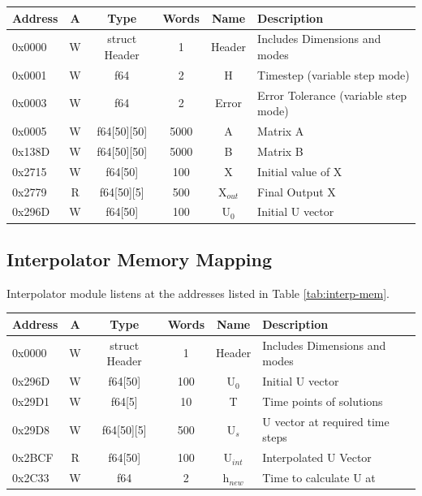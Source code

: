 \documentclass[12pt]{report}
\begin{document}
\begin{center}
 \begin{tabular}{||l| c| c| c| c| l||} 
 \hline
 Address & A & Type & Words & Name & Description  \\ [0.5ex] 
 \hline\hline
  0x0000 & W & struct Header & 1 & Header & Includes Dimensions and modes  \\ 
 \hline
 0x0001  & W & f64 & 2 & H & Timestep (variable step mode)  \\
 \hline
 0x0003  & W & f64 & 2 & Error & Error Tolerance (variable step mode) \\
 \hline
 0x0005  & W & f64[50][50] & 5000 & A & Matrix A \\
 \hline
 0x138D  & W & f64[50][50] & 5000 & B & Matrix B \\
 \hline
 0x2715  & W & f64[50] & 100 & X & Initial value of X \\
 \hline
 0x2779  & R & f64[50][5] & 500 & X$_{out}$ & Final Output X \\
 \hline
 0x296D  & W & f64[50] & 100 & U$_{0}$ & Initial U vector \\
 \hline
\end{tabular}
\end{center}

\subsection{Interpolator Memory Mapping}
Interpolator module listens at the addresses listed in Table \ref{tab:interp-mem}.

\begin{center}
 \begin{tabular}{||l |c| c| c| c| l||} 
 \hline
 Address & A & Type & Words & Name & Description  \\ [0.5ex] 
 \hline\hline
  0x0000 & W & struct Header & 1 & Header & Includes Dimensions and modes  \\ 
  \hline
  0x296D  & W & f64[50] & 100 & U$_0$ & Initial U vector \\
 \hline
 0x29D1  & W & f64[5] & 10 & T & Time points of solutions  \\
 \hline
 0x29D8  & W & f64[50][5] & 500 & U$_s$ & U vector at required time steps \\
 \hline
 0x2BCF  & R & f64[50] & 100 & U$_{int}$ & Interpolated U Vector \\
 \hline
 0x2C33  & W & f64 & 2 & h$_{new}$ & Time to calculate U at \\
 \hline
\end{tabular}
\end{center}
\end{document}

